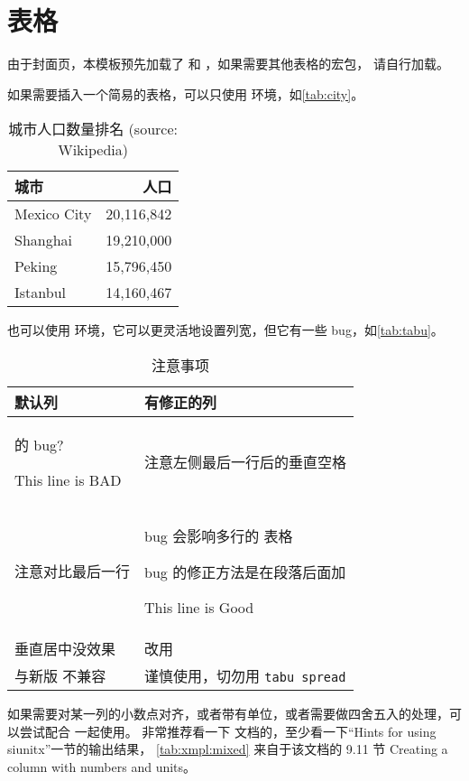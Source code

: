 \section{表格}

由于封面页，本模板预先加载了  和 ，如果需要其他表格的宏包，
请自行加载。

如果需要插入一个简易的表格，可以只使用  环境，如\autoref{tab:city}。
\begin{table}[!htb]
  \caption[城市人口]{城市人口数量排名 (source: Wikipedia)\label{tab:city}}
  \begin{tabular}{lr}
    \toprule
    城市 & 人口 \\
    \midrule
    Mexico City & 20,116,842\\
    Shanghai & 19,210,000\\
    Peking & 15,796,450\\
    Istanbul & 14,160,467\\
    \bottomrule
  \end{tabular}
\end{table}

也可以使用  环境，它可以更灵活地设置列宽，但它有一些 bug，如\autoref{tab:tabu}。
\begin{table}[!htb]
  \caption{ 注意事项 \label{tab:tabu}}
  \begin{tabu} to .9 \toprule
    默认列 & 有修正的列 \\ \midrule
     的 bug? \par This line is BAD & 注意左侧最后一行后的垂直空格 \\ \midrule
    注意对比最后一行 &
      bug 会影响多行的  表格 \par
      bug 的修正方法是在段落后面加  \par
      This line is Good \\ \midrule
    垂直居中没效果 & 改用  \\ \midrule
    与新版  不兼容 & 谨慎使用，切勿用 \texttt{tabu spread} \\ \bottomrule
  \end{tabu}
\end{table}

如果需要对某一列的小数点对齐，或者带有单位，或者需要做四舍五入的处理，可以尝试配合  一起使用。
非常推荐看一下  文档的，至少看一下“Hints for using siunitx”一节的输出结果，
\autoref{tab:xmpl:mixed} 来自于该文档的 9.11 节 Creating a column with numbers and units。

